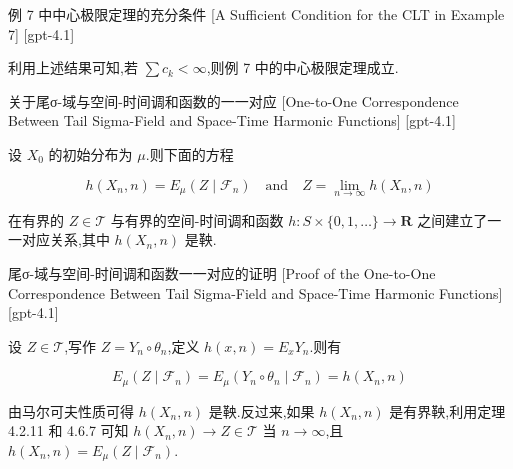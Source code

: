 \documentclass[UTF8]{ctexart}
\begin{document}
    
    
    \begin{thm}
        {例 7 中中心极限定理的充分条件}
        [A Sufficient Condition for the CLT in Example 7]
        [gpt-4.1]
        
利用上述结果可知,若 $\sum c_{k} < \infty$,则例 7 中的中心极限定理成立.

    \end{thm}
    
    
    
    \begin{thm}
        {关于尾σ-域与空间-时间调和函数的一一对应}
        [One-to-One Correspondence Between Tail Sigma-Field and Space-Time Harmonic Functions]
        [gpt-4.1]
        
设 $X_{0}$ 的初始分布为 $\mu$.则下面的方程

\[
h(X_{n}, n) = E_{\mu}(Z \mid \mathcal{F}_{n}) \quad \text{and} \quad Z = \operatorname*{lim}_{n \to \infty} h(X_{n}, n)
\]

在有界的 $Z \in \mathcal{T}$ 与有界的空间-时间调和函数 $h : S \times \{ 0, 1, \ldots \} \to \mathbf{R}$ 之间建立了一一对应关系,其中 $h(X_{n}, n)$ 是鞅.

    \end{thm}
    
    
    
    \begin{prf}
        {尾σ-域与空间-时间调和函数一一对应的证明}
        [Proof of the One-to-One Correspondence Between Tail Sigma-Field and Space-Time Harmonic Functions]
        [gpt-4.1]
        
设 $Z \in \mathcal{T}$,写作 $Z = Y_{n} \circ \theta_{n}$,定义 $h(x, n) = E_{x} Y_{n}$.则有

\[
E_{\mu}(Z \mid \mathcal{F}_{n}) = E_{\mu}(Y_{n} \circ \theta_{n} \mid \mathcal{F}_{n}) = h(X_{n}, n)
\]

由马尔可夫性质可得 $h(X_{n}, n)$ 是鞅.反过来,如果 $h(X_{n}, n)$ 是有界鞅,利用定理 4.2.11 和 4.6.7 可知 $h(X_{n}, n) \to Z \in \mathcal{T}$ 当 $n \to \infty$,且 $h(X_{n}, n) = E_{\mu}(Z \mid \mathcal{F}_{n})$.

    \end{prf}
    
    
    
\end{document}
